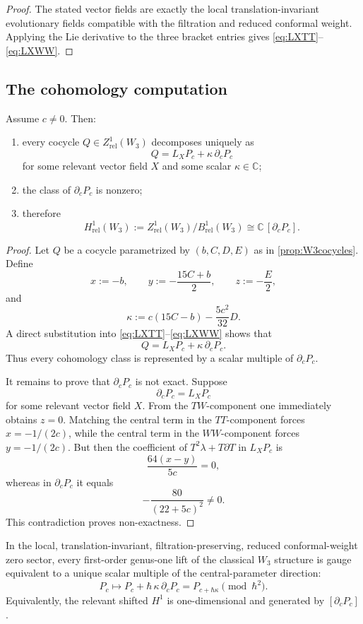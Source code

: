 \begin{proof}
The stated vector fields are exactly the local translation-invariant evolutionary fields
compatible with the filtration and reduced conformal weight. Applying the Lie derivative
to the three bracket entries gives \eqref{eq:LXTT}--\eqref{eq:LXWW}.
\end{proof}

\subsection{The cohomology computation}

\begin{theorem}\label{thm:H1W3}
Assume $c\neq 0$. Then:
\begin{enumerate}[leftmargin=2.4em]
\item every cocycle $Q\in Z^1_{\mathrm{rel}}(W_3)$ decomposes uniquely as
\[
Q=L_XP_c+\kappa\,\partial_c P_c
\]
for some relevant vector field $X$ and some scalar $\kappa\in \mathbb C$;
\item the class of $\partial_c P_c$ is nonzero;
\item therefore
\[
H^1_{\mathrm{rel}}(W_3):=
Z^1_{\mathrm{rel}}(W_3)/B^1_{\mathrm{rel}}(W_3)
\cong \mathbb C\,[\partial_cP_c].
\]
\end{enumerate}
\end{theorem}

\begin{proof}
Let $Q$ be a cocycle parametrized by $(b,C,D,E)$ as in \cref{prop:W3cocycles}.
Define
\[
x:=-b,\qquad
y:=-\frac{15C+b}{2},\qquad
z:=-\frac E2,
\]
and
\[
\kappa:=c(15C-b)-\frac{5c^2}{32}D.
\]
A direct substitution into \eqref{eq:LXTT}--\eqref{eq:LXWW} shows that
\[
Q=L_XP_c+\kappa\,\partial_cP_c.
\]
Thus every cohomology class is represented by a scalar multiple of $\partial_cP_c$.

It remains to prove that $\partial_cP_c$ is not exact. Suppose
\[
\partial_cP_c=L_XP_c
\]
for some relevant vector field $X$. From the $TW$-component one immediately obtains
$z=0$. Matching the central term in the $TT$-component forces $x=-1/(2c)$, while the
central term in the $WW$-component forces $y=-1/(2c)$. But then the coefficient of
$T^2\lambda+T\partial T$ in $L_XP_c$ is
\[
\frac{64(x-y)}{5c}=0,
\]
whereas in $\partial_cP_c$ it equals
\[
-\frac{80}{(22+5c)^2}\neq 0.
\]
This contradiction proves non-exactness.
\end{proof}

\begin{corollary}\label{cor:unique-lift}
In the local, translation-invariant, filtration-preserving, reduced conformal-weight zero
sector, every first-order genus-one lift of the classical $W_3$ structure is gauge equivalent
to a unique scalar multiple of the central-parameter direction:
\[
P_c\longmapsto P_c+\hbar\,\kappa\,\partial_cP_c
=
P_{c+\hbar\kappa}\pmod{\hbar^2}.
\]
Equivalently, the relevant shifted $H^1$ is one-dimensional and generated by
$[\partial_cP_c]$.
\end{corollary}

